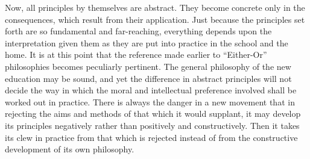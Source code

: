 Now, all principles by themselves are abstract. They become concrete only in the 
consequences, which result from their application. Just because the principles set forth 
are so fundamental and far-reaching, everything depends upon the interpretation given 
them as they are put into practice in the school and the home. It is at this point that the 
reference made earlier to \enquote{Either-Or} philosophies becomes peculiarly pertinent. The 
general philosophy of the new education may be sound, and yet the difference in abstract 
principles will not decide the way in which the moral and intellectual preference involved 
shall be worked out in practice. There is always the danger in a new movement that in 
rejecting the aims and methods of that which it would supplant, it may develop its 
principles negatively rather than positively and constructively. Then it takes its clew in 
practice from that which is rejected instead of from the constructive development of its 
own philosophy. 

